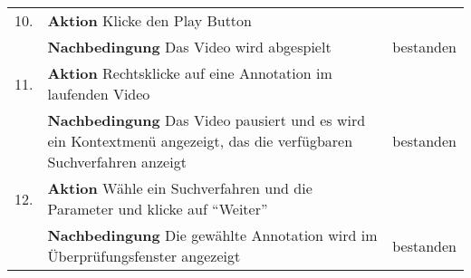 \begin{enumerate} [label=\bfseries /TS \arabic*0/, leftmargin=*]
\begin{tabular}{rp{4in}|l}
	\hline
	10. & \textbf{Aktion} Klicke den Play Button & \\
	    & \textbf{Nachbedingung} Das Video wird abgespielt & bestanden \\
	\hline
	11. & \textbf{Aktion} Rechtsklicke auf eine Annotation im laufenden Video & \\
	    & \textbf{Nachbedingung} Das Video pausiert und es wird ein Kontextmenü angezeigt, das die verfügbaren Suchverfahren anzeigt & bestanden \\
	\hline
	12. & \textbf{Aktion} Wähle ein Suchverfahren und die Parameter und klicke auf \enquote{Weiter} & \\
	    & \textbf{Nachbedingung} Die gewählte Annotation wird im Überprüfungsfenster angezeigt & bestanden \\
	\end{tabular}
	\newline


\end{enumerate}
